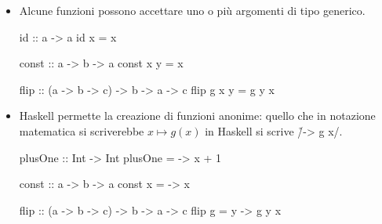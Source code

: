 \begin{frame}[fragile]
\begin{itemize}
\item Alcune funzioni possono accettare uno o più argomenti di tipo generico.
\pause

\begin{haskellcode}
id :: a -> a
id x = x

const :: a -> b -> a
const x y = x

flip :: (a -> b -> c) -> b -> a -> c
flip g x y = g y x
\end{haskellcode}

\end{itemize}
\end{frame}

\begin{frame}[fragile]
\begin{itemize}
\item Haskell permette la creazione di funzioni anonime: quello che in notazione matematica si scriverebbe $x\mapsto g(x)$ in Haskell si scrive \h/\x -> g x/.

\pause
\begin{haskellcode}
plusOne :: Int -> Int
plusOne = \x -> x + 1

const :: a -> b -> a
const x = \y -> x

flip :: (a -> b -> c) -> b -> a -> c
flip g = \x y -> g y x
\end{haskellcode}
\end{itemize}
\end{frame}
